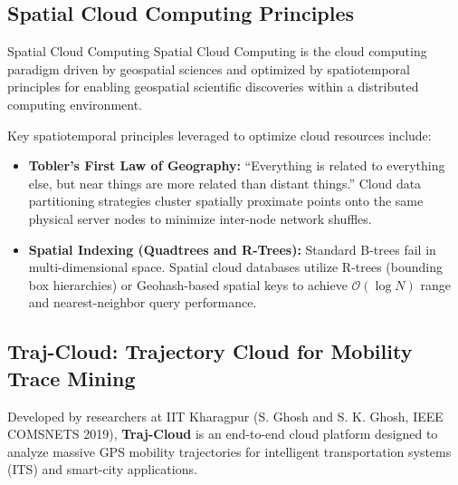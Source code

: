 \subsection{Spatial Cloud Computing Principles}
\begin{defbox}{Spatial Cloud Computing}
Spatial Cloud Computing is the cloud computing paradigm driven by geospatial sciences and optimized by spatiotemporal principles for enabling geospatial scientific discoveries within a distributed computing environment.
\end{defbox}

Key spatiotemporal principles leveraged to optimize cloud resources include:
\begin{itemize}[leftmargin=*]
  \item \textbf{Tobler's First Law of Geography:} ``Everything is related to everything else, but near things are more related than distant things.'' Cloud data partitioning strategies cluster spatially proximate points onto the same physical server nodes to minimize inter-node network shuffles.
  \item \textbf{Spatial Indexing (Quadtrees and R-Trees):} Standard B-trees fail in multi-dimensional space. Spatial cloud databases utilize R-trees (bounding box hierarchies) or Geohash-based spatial keys to achieve $\mathcal{O}(\log N)$ range and nearest-neighbor query performance.
\end{itemize}

\subsection{Traj-Cloud: Trajectory Cloud for Mobility Trace Mining}
Developed by researchers at IIT Kharagpur (S. Ghosh and S. K. Ghosh, IEEE COMSNETS 2019), \textbf{Traj-Cloud} is an end-to-end cloud platform designed to analyze massive GPS mobility trajectories for intelligent transportation systems (ITS) and smart-city applications.

